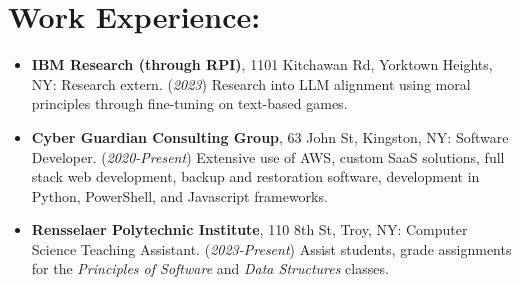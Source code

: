 \documentclass[12pt]{article}
\begin{document}
\section*{Work Experience:}
\begin{itemize}
    \itemsep0em 
    \item \textbf{IBM Research (through RPI)}, 1101 Kitchawan Rd, Yorktown Heights, NY: Research extern. (\textit{2023}) Research into LLM alignment using moral principles through fine-tuning on text-based games.
    
    \item \textbf{Cyber Guardian Consulting Group}, 63 John St, Kingston, NY: Software Developer. (\textit{2020-Present}) Extensive use of AWS, custom SaaS solutions, full stack web development, backup and restoration software, development in Python, PowerShell, and Javascript frameworks.
    
    \item \textbf{Rensselaer Polytechnic Institute}, 110 8th St, Troy, NY: Computer Science Teaching Assistant. (\textit{2023-Present}) Assist students, grade assignments for the \textit{Principles of Software} and \textit{Data Structures} classes.
\end{itemize}
\end{document}

